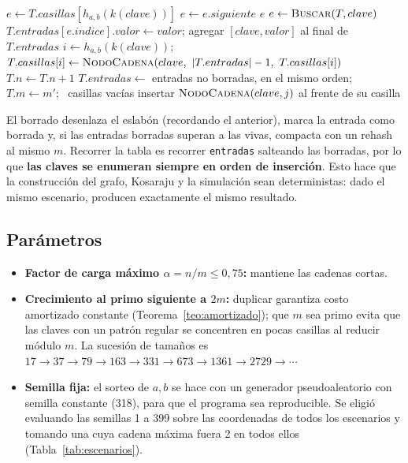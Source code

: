 \documentclass[11pt,a4paper]{article}
\theoremstyle{definition}
\begin{document}
\begin{algorithm}[H]
\caption{Operaciones de la tabla hash}
\begin{algorithmic}[1]
  \State $e \gets T.casillas[h_{a,b}(k(clave))]$
   \State $e\gets e.siguiente$ \EndWhile
  \State \Return $e$ 
\EndFunction
{}
  \State $e\gets\Call{Buscar}{T,clave}$
   $T.entradas[e.indice].valor\gets valor$; \Return \EndIf
  \State agregar $[clave,valor]$ al final de $T.entradas$
  \State $i\gets h_{a,b}(k(clave))$; \ $T.casillas[i]\gets \textsc{NodoCadena}(clave,\ |T.entradas|-1,\ T.casillas[i])$ 
  \State $T.n\gets T.n+1$
    \EndIf
\EndProcedure
{}
  \State $T.entradas\gets$ entradas no borradas, en el mismo orden; \ $T.m\gets m'$; \ casillas vacías
   insertar $\textsc{NodoCadena}(clave,j)$ al frente de su casilla \EndFor
\EndProcedure
\end{algorithmic}
\end{algorithm}

El borrado desenlaza el eslabón (recordando el anterior), marca la entrada como borrada y, si las entradas borradas superan a las vivas, compacta con un rehash al mismo $m$. Recorrer la tabla es recorrer \texttt{{}entradas} salteando las borradas, por lo que \textbf{las claves se enumeran siempre en orden de inserción}. Esto hace que la construcción del grafo, Kosaraju y la simulación sean deterministas: dado el mismo escenario, producen exactamente el mismo resultado.

\subsection{Parámetros}
\begin{itemize}[leftmargin=*]
\item \textbf{Factor de carga máximo $\alpha=n/m\le 0{,}75$:} mantiene las cadenas cortas.
\item \textbf{Crecimiento al primo siguiente a $2m$:} duplicar garantiza costo amortizado constante (Teorema~\ref{teo:amortizado}); que $m$ sea primo evita que las claves con un patrón regular se concentren en pocas casillas al reducir módulo $m$. La sucesión de tamaños es $17\to37\to79\to163\to331\to673\to1361\to2729\to\cdots$
\item \textbf{Semilla fija:} el sorteo de $a,b$ se hace con un generador pseudoaleatorio con semilla constante (318), para que el programa sea reproducible. Se eligió evaluando las semillas 1 a 399 sobre las coordenadas de todos los escenarios y tomando una cuya cadena máxima fuera 2 en todos ellos (Tabla~\ref{tab:escenarios}).
\end{itemize}
\end{document}

